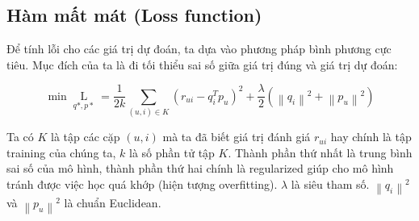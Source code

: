 \subsection{Hàm mất mát (Loss function)}
Để tính lỗi cho các giá trị dự đoán, ta dựa vào phương pháp bình phương cực tiêu. Mục đích của ta là đi tối thiểu sai số giữa giá trị đúng và giá trị dự đoán:
\begin{center}
    \begin{equation} \label{lossfunc}
        \min \mathop {L}\limits_{q*,p*}= \frac{1}{{2k}}\sum\limits_{(u,i) \in K} {{{({r_{ui}} - q_i^T{p_u})}^2} + \frac{\lambda}{2} ({{\left\| {{q_i}} \right\|}^2} + {{\left\| p_u \right\|}^2})}
    \end{equation}
\end{center}
Ta có $K$ là tập các cặp $(u,i)$ mà ta đã biết giá trị đánh giá $r_{ui}$ hay chính là tập training của chúng ta, $k$ là số phần tử tập $K$. Thành phần thứ nhất là trung bình sai số của mô hình, thành phần thứ hai chính là regularized giúp cho mô hình tránh được việc học quá khớp (hiện tượng overfitting). $\lambda$ là siêu tham số. ${{{\left\| {{q_i}} \right\|}^2}}$ và ${{{\left\| p_u \right\|}^2}}$ là chuẩn Euclidean.
